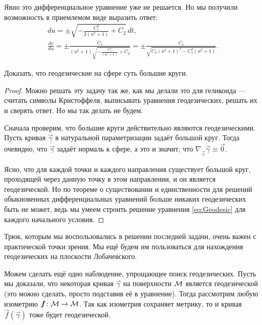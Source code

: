 \begin{solution}
	Явно это дифференциальное уравнение уже не решается. Но мы получили возможность в приемлемом виде выразить ответ:
	\begin{gather*}
		du = \pm\sqrt{-\frac{C_1^2}{2(u^2 + 1)} + C_2}\,dt,\\
		\frac{dv}{du} = \pm\frac{C_1}{(u^2 + 1)\sqrt{-\frac{C_1^2}{(u^2 + 1)} + C_2}} = \pm\frac{C_1}{\sqrt{C_2(u^2 + 1)^2 - C_1^2(u^2 + 1)}}.
	\end{gather*}
\end{solution}

\begin{problem}
	Доказать, что геодезические на сфере суть большие круги.
\end{problem}

\begin{proof}
	Можно решать эту задачу так же, как мы делали это для геликоида --- считать символы Кристоффеля, выписывать уравнения геодезических, решать их и сверять ответ. Но мы так делать не будем\footnotemark.


	Сначала проверим, что большие круги действительно являются геодезическими. Пусть кривая $\vec{\gamma}$ в натуральной параметризации задаёт большой круг. Тогда очевидно, что $\ddot{\vec{\gamma}}$ задаёт нормаль к сфере, а это и значит, что $\nabla_{\dot{\vec{\gamma}}}\dot{\vec{\gamma}} \equiv \vec{0}$.

	Ясно, что для каждой точки и каждого направления существует большой круг, проходящей через данную точку в этом направлении, и он является геодезической. Но по теореме о существовании и единственности для решений обыкновенных дифференциальных уравнений больше никаких геодезических быть не может, ведь мы умеем строить решение уравнения \eqref{eq:Geodesic} для каждого начального условия.
\end{proof}

Трюк, которым мы воспользовались в решении последней задачи, очень важен с практической точки зрения. Мы ещё будем им пользоваться для нахождения геодезических на плоскости Лобачевского.

Можем сделать ещё одно наблюдение, упрощающее поиск геодезических. Пусть мы доказали, что некоторая кривая $\vec{\gamma}$ на поверхности $\mathcal{M}$ является геодезической (это можно сделать, просто подставив её в уравнение). Тогда рассмотрим любую изометрию $\boldsymbol{f}\colon \mathcal{M} \to \mathcal{M}$. Так как изометрия сохраняет метрику, то и кривая $\vec{f}(\vec{\gamma})$ тоже будет геодезической.

